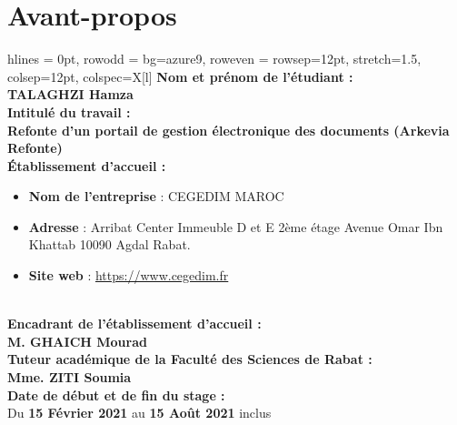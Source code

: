 {}
\noindent \section*{Avant-propos}
\vspace{0.25cm}
    \begin{table}[htb!]
    \centering
    \begin{tblr}{ 
    hlines = {0pt},
 row{odd} = {bg=azure9},
  row{even} = {rowsep=12pt},
 stretch=1.5,
 colsep=12pt,
 colspec={X[l]}
}
 \textbf{Nom et prénom de l’étudiant :} \\
 \textbf{TALAGHZI Hamza}\\
 \textbf{Intitulé du travail :}\\
\textbf{Refonte d'un portail de gestion électronique des documents (Arkevia Refonte)}\\
\textbf{Établissement d’accueil :}\\
\begin{minipage} [t] {0.9\textwidth} 
\begin{itemize}
    \item \textbf{Nom de l'entreprise} : CEGEDIM MAROC
    \item \textbf{Adresse} : Arribat Center Immeuble D et E 2ème étage Avenue Omar Ibn Khattab 10090 Agdal Rabat.
    \item \textbf{Site web} : \url{https://www.cegedim.fr}
\end{itemize}
\end{minipage}\\
\textbf{Encadrant de l’établissement d’accueil :}\\
\textbf{M. GHAICH Mourad}\\
\textbf{Tuteur académique de la Faculté des Sciences de Rabat :}\\
\textbf{Mme. ZITI Soumia}\\
\textbf{Date de début et de fin du stage :}\\
Du \textbf{15 Février 2021} au \textbf{15 Août 2021} inclus
\end{tblr}

\end{table}
